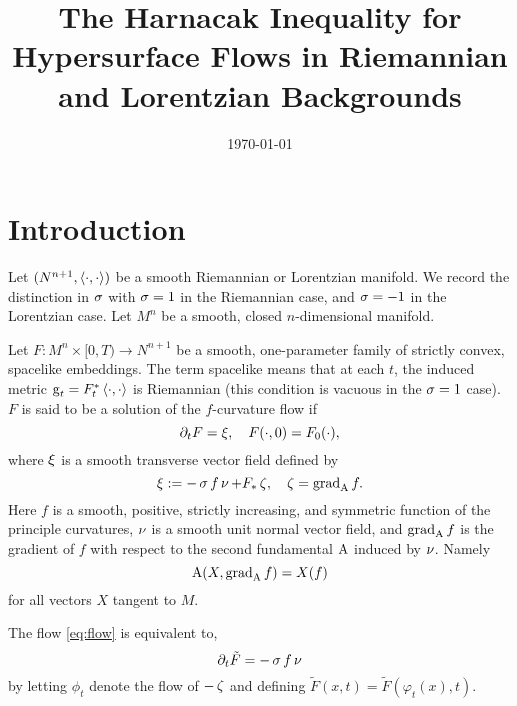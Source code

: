 \documentclass{amsart}
\begin{document}
\title[Hypersurface Harnack Inequality]
 {The Harnacak Inequality for Hypersurface Flows in Riemannian and Lorentzian Backgrounds}

\curraddr{}
\email{}
\date{\today}

\dedicatory{}
\subjclass[2010]{}
\keywords{}

\begin{abstract}

\end{abstract}

\maketitle

\section{Introduction}

Let $(N^{n+1},\bgg)$ be a smooth Riemannian or Lorentzian manifold. We record the distinction in \(\operatorname{\sigma}\) with \(\operatorname{\sigma} = 1\) in the Riemannian case, and \(\operatorname{\sigma} = -1\) in the Lorentzian case. Let $M^n$ be a smooth, closed $n$-dimensional manifold.

Let $F\colon M^n\times [0,T)\to N^{n+1}$ be a smooth, one-parameter family of strictly convex, spacelike embeddings. The term spacelike means that at each \(t\), the induced metric \(\g_t = F_t^{\ast} \bgg\) is Riemannian (this condition is vacuous in the \(\operatorname{\sigma} = 1\) case). \(F\) is said to be a solution of the $f$-curvature flow if
\begin{equation}
\label{eq:flow}
\partial_tF = \operatorname{\xi},\quad F(\cdot, 0) = F_0(\cdot),
\end{equation}
where $\operatorname{\xi} $ is a smooth transverse vector field defined by
\begin{equation}
\label{eq:transverse_vector}
\operatorname{\xi} := -\operatorname{\sigma} f\operatorname{\nu} + F_{\ast} \operatorname{\zeta}, \quad \operatorname{\zeta} = \operatorname{grad}_{\operatorname{A}} f.
\end{equation}
Here $f$ is a smooth, positive, strictly increasing, and symmetric function of the principle curvatures, $\operatorname{\nu}$ is a smooth unit normal vector field, and $\operatorname{grad}_{\operatorname{A}} f$ is the gradient of $f$ with respect to the second fundamental $\operatorname{A}$ induced by $\operatorname{\nu}$. Namely
\[
\operatorname{A}(X, \operatorname{grad}_{\operatorname{A}} f) = X(f)
\]
for all vectors $X$ tangent to $M$.

The flow \eqref{eq:flow} is equivalent to,
\[
\partial_t \tilde{F} = -\operatorname{\sigma} f \operatorname{\nu}
\]
by letting \(\phi_t\) denote the flow of \(-\operatorname{\zeta}\) and defining \(\tilde{F} (x, t) = \tilde{F}(\varphi_t(x), t)\).
\end{document}
